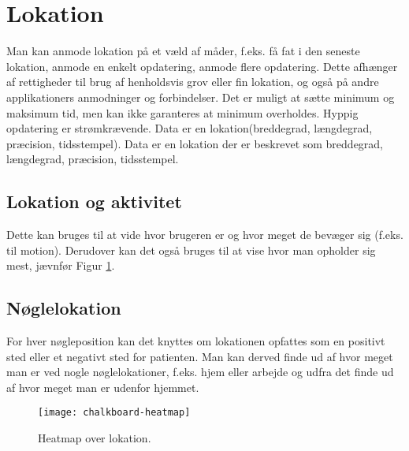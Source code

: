 \section{Lokation}
Man kan anmode lokation på et væld af måder, f.eks. få fat i den seneste lokation, anmode en enkelt opdatering, anmode flere opdatering. 
Dette afhænger af rettigheder til brug af henholdsvis grov eller fin lokation, og også på andre applikationers anmodninger og forbindelser. Det er muligt at sætte minimum og maksimum tid, men kan ikke garanteres at minimum overholdes. Hyppig opdatering er strømkrævende. 
Data er en lokation(breddegrad, længdegrad, præcision, tidsstempel).
Data er en lokation der er beskrevet som breddegrad, længdegrad, præcision, tidsstempel.

\subsection{Lokation og aktivitet}
Dette kan bruges til at vide hvor brugeren er og hvor meget de bevæger sig (f.eks. til motion).
Derudover kan det også bruges til at vise hvor man opholder sig mest, jævnfør Figur \ref{heatmap}.
\subsection{Nøglelokation}
For hver nøgleposition kan det knyttes om lokationen opfattes som en positivt sted eller et negativt sted for patienten.
Man kan derved finde ud af hvor meget man er ved nogle nøglelokationer, f.eks. hjem eller arbejde og udfra det finde ud af hvor meget man er udenfor hjemmet. 

\begin{figure}[H]
	\centering
	\texttt{[image: chalkboard-heatmap]}
	\caption{Heatmap over lokation.}\label{heatmap}
\end{figure}
